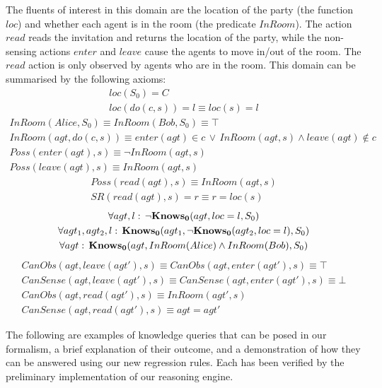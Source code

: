 The fluents of interest in this domain are the location of the party
(the function $loc$) and whether each agent is in the room (the predicate
$InRoom$). The action $read$ reads the invitation and returns the
location of the party, while the non-sensing actions $enter$ and
$leave$ cause the agents to move in/out of the room. The $read$
action is only observed by agents who are in the room. This domain
can be summarised by the following axioms:\begin{gather*}
loc(S_{0})=C\\
loc(do(c,s))=l\equiv loc(s)=l\end{gather*}
 \begin{gather*}
InRoom(Alice,S_{0})\equiv InRoom(Bob,S_{0})\equiv\top\\
InRoom(agt,do(c,s))\equiv enter(agt)\in c\,\vee\, InRoom(agt,s)\wedge leave(agt)\notin c\\
Poss(enter(agt),s)\equiv\neg InRoom(agt,s)\\
Poss(leave(agt),s)\equiv InRoom(agt,s)\end{gather*}
 \begin{gather*}
Poss(read(agt),s)\equiv InRoom(agt,s)\\
SR(read(agt),s)=r\equiv r=loc(s)\end{gather*}
 \begin{gather*}
\forall agt,l:\,\neg\mathbf{Knows_{0}}(agt,loc=l,S_{0})\\
\forall agt_{1},agt_{2},l:\,\mathbf{Knows_{0}}(agt_{1},\neg\mathbf{Knows_{0}}(agt_{2},loc=l),S_{0})\\
\forall agt:\,\mathbf{Knows_{0}}(agt,InRoom(Alice)\wedge InRoom(Bob),S_{0})\end{gather*}
 \begin{gather*}
CanObs(agt,leave(agt'),s)\equiv CanObs(agt,enter(agt'),s)\equiv\top\\
CanSense(agt,leave(agt'),s)\equiv CanSense(agt,enter(agt'),s)\equiv\bot\\
CanObs(agt,read(agt'),s)\equiv InRoom(agt',s)\\
CanSense(agt,read(agt'),s)\equiv agt=agt'\end{gather*}


The following are examples of knowledge queries that can be posed
in our formalism, a brief explanation of their outcome, and a demonstration
of how they can be answered using our new regression rules. Each has
been verified by the preliminary implementation of our reasoning engine.\newpage{}

